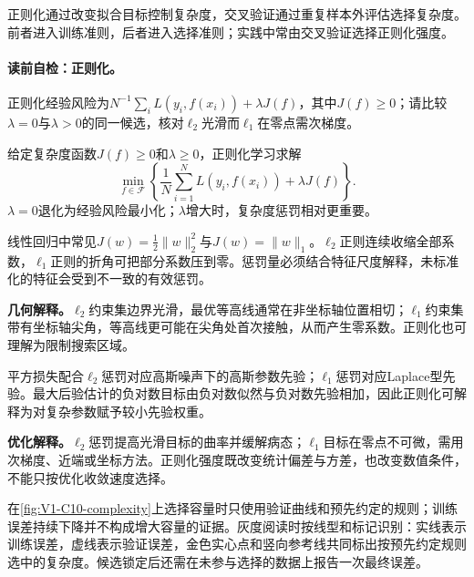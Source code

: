 正则化通过改变拟合目标控制复杂度，交叉验证通过重复样本外评估选择复杂度。前者进入训练准则，后者进入选择准则；实践中常由交叉验证选择正则化强度。

\paragraph{读前自检：正则化。}正则化经验风险为$N^{-1}\sum_iL(y_i,f(x_i))+\lambda J(f)$，其中$J(f)\ge0$；请比较$\lambda=0$与$\lambda>0$的同一候选，核对$\ell_2$光滑而$\ell_1$在零点需次梯度。\par

\begin{definition}[正则化经验风险]
给定复杂度函数$J(f)\ge0$和$\lambda\ge0$，正则化学习求解
\[
\min_{f\in\mathcal F}\left\{\frac1N\sum_{i=1}^N L(y_i,f(x_i))+\lambda J(f)\right\}.
\]
$\lambda=0$退化为经验风险最小化；$\lambda$增大时，复杂度惩罚相对更重要。
\end{definition}

线性回归中常见$J(w)=\tfrac12\|w\|_2^2$与$J(w)=\|w\|_1$。$\ell_2$正则连续收缩全部系数，$\ell_1$正则的折角可把部分系数压到零。惩罚量必须结合特征尺度解释，未标准化的特征会受到不一致的有效惩罚。

\label{struct:V1-C10-CH14}
\begin{geometrybox}
\textbf{几何解释。}$\ell_2$约束集边界光滑，最优等高线通常在非坐标轴位置相切；$\ell_1$约束集带有坐标轴尖角，等高线更可能在尖角处首次接触，从而产生零系数。正则化也可理解为限制搜索区域。
\end{geometrybox}

\label{struct:V1-C10-CH15}
\begin{probabilitybox}
平方损失配合$\ell_2$惩罚对应高斯噪声下的高斯参数先验；$\ell_1$惩罚对应Laplace型先验。最大后验估计的负对数目标由负对数似然与负对数先验相加，因此正则化可解释为对复杂参数赋予较小先验权重。
\end{probabilitybox}

\label{struct:V1-C10-CH16}
\begin{optimizationbox}
\textbf{优化解释。}$\ell_2$惩罚提高光滑目标的曲率并缓解病态；$\ell_1$目标在零点不可微，需用次梯度、近端或坐标方法。正则化强度既改变统计偏差与方差，也改变数值条件，不能只按优化收敛速度选择。
\end{optimizationbox}

\label{struct:V1-C10-CH17}
\begingroup
{}

\endgroup
在\cref{fig:V1-C10-complexity}上选择容量时只使用验证曲线和预先约定的规则；训练误差持续下降并不构成增大容量的证据。灰度阅读时按线型和标记识别：实线表示训练误差，虚线表示验证误差，金色实心点和竖向参考线共同标出按预先约定规则选中的复杂度。候选锁定后还需在未参与选择的数据上报告一次最终误差。

